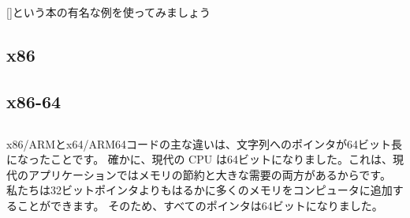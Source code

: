 \mysection{\HelloWorldSectionName}
\label{sec:helloworld}

[\KRBook]という本の有名な例を使ってみましょう



\subsection{x86}





\subsection{x86-64}







\subsection{\Conclusion{}}

x86/ARMとx64/ARM64コードの主な違いは、文字列へのポインタが64ビット長になったことです。
確かに、現代の \ac{CPU} は64ビットになりました。これは、現代のアプリケーションではメモリの節約と大きな需要の両方があるからです。
私たちは32ビットポインタよりもはるかに多くのメモリをコンピュータに追加することができます。
そのため、すべてのポインタは64ビットになりました。


